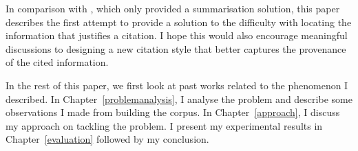 In comparison with \cite{csibs}, which only provided a summarisation solution, this paper describes the first attempt to provide a solution to the difficulty with locating the information that justifies a citation. I hope this would also encourage meaningful discussions to designing a new citation style that better captures the provenance of the cited information.

In the rest of this paper, we first look at past works related to the phenomenon I described. In Chapter~\ref{problemanalysis}, I analyse the problem and describe some observations I made from building the corpus. In Chapter~\ref{approach}, I discuss my approach on tackling the problem. I present my experimental results in Chapter~\ref{evaluation} followed by my conclusion.
